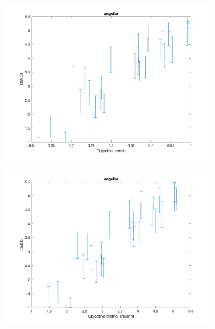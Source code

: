 \documentclass{article}
\begin{document}
\begin{figure}
    \centering
   \begin{subfigure}[b]{0.65\textwidth}
   \includegraphics[width=\textwidth]{Figures/task3/angular.png}
   \end{subfigure}
   
   \begin{subfigure}[b]{0.65\textwidth}
   \includegraphics[width=\textwidth]{Figures/task3/angular_linear.png}
   \end{subfigure}
   

\end{figure}
\end{document}
